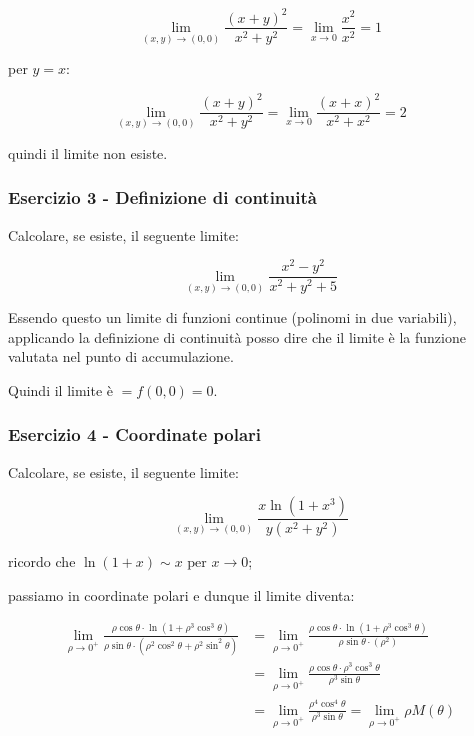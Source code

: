\[
    \lim_{ (x,y) \to (0,0) } \frac{{(x+y)}^{2}}{x^{2}+y^{2}} = \lim_{ x \to 0 } \frac{x^{2}}{x^{2}} = 1
\]

per \(y=x\):

\[
    \lim_{ (x,y) \to (0,0) } \frac{{(x+y)}^{2}}{x^{2}+y^{2}} = \lim_{ x \to 0 } \frac{{(x+x)}^{2}}{x^{2}+x^{2}} = 2
\]

quindi il limite non esiste.

\filbreak{}
\subsubsection*{Esercizio 3 {-} Definizione di continuità}

Calcolare, se esiste, il seguente limite:

\[
    \lim_{ (x,y) \to (0,0) } \frac{x^{2}-y^{2}}{x^{2}+y^{2}+5}
\]

Essendo questo un limite di funzioni continue (polinomi in due variabili), applicando la definizione di continuità posso dire che il limite è la funzione valutata nel punto di accumulazione.

Quindi il limite è \(= f(0,0) = 0\).

\filbreak{}
\subsubsection*{Esercizio 4 {-} Coordinate polari}

Calcolare, se esiste, il seguente limite:

\[
    \lim_{ (x,y) \to (0,0) } \frac{x\ln(1+x^{3})}{y(x^{2}+y^{2})}
\]

ricordo che \(\ln(1 + x) \sim x \text{ per } x\to0\);

passiamo in coordinate polari e dunque il limite diventa:

\begin{align*}
    \lim_{ \rho \to 0^{+} } \frac{\rho\cos\theta \cdot\ln\left(1+\rho^{3}\cos^{3}\theta \right)}{\rho\sin\theta \cdot\left(\rho^{2}\cos^{2}\theta  + \rho^{2}\sin^{2}\theta \right)} & = \lim_{ \rho \to 0^{+} } \frac{\rho\cos\theta \cdot\ln(1+\rho^{3}\cos^{3}\theta )}{\rho\sin\theta \cdot (\rho^{2}) } \\
                                                                                                                                                                                      & = \lim_{ \rho \to 0^{+} } \frac{\rho\cos\theta \cdot \rho^{3}\cos^{3}\theta}{\rho^{3}\sin\theta }                      \\
                                                                                                                                                                                      & = \lim_{ \rho \to 0^{+} } \frac{\rho^{4}\cos^{4}\theta }{\rho^{3}\sin\theta } = \lim_{ \rho \to 0^{+} } \rho M(\theta)
\end{align*}

